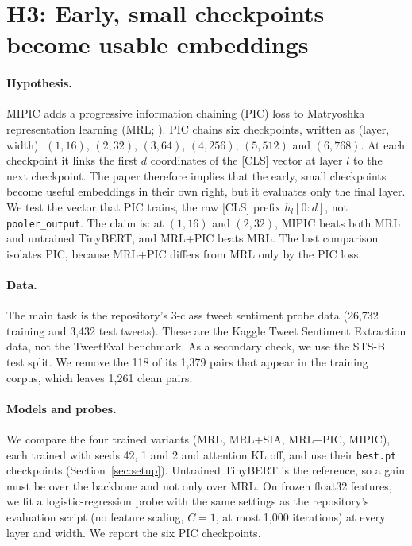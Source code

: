 \section{H3: Early, small checkpoints become usable embeddings}
\label{sec:h3}

\paragraph{Hypothesis.}
MIPIC \citep{mipic2026} adds a progressive information chaining (PIC) loss to Matryoshka representation learning (MRL; \citealp{kusupati2022mrl}).
PIC chains six checkpoints, written as (layer, width): $(1,16)$, $(2,32)$, $(3,64)$, $(4,256)$, $(5,512)$ and $(6,768)$.
At each checkpoint it links the first $d$ coordinates of the [CLS] vector at layer $l$ to the next checkpoint.
The paper therefore implies that the early, small checkpoints become useful embeddings in their own right, but it evaluates only the final layer.
We test the vector that PIC trains, the raw [CLS] prefix $h_l[0{:}d]$, not \texttt{pooler\_output}.
The claim is: at $(1,16)$ and $(2,32)$, MIPIC beats both MRL and untrained TinyBERT, and MRL+PIC beats MRL.
The last comparison isolates PIC, because MRL+PIC differs from MRL only by the PIC loss.

\paragraph{Data.}
The main task is the repository's 3-class tweet sentiment probe data (26,732 training and 3,432 test tweets).
These are the Kaggle Tweet Sentiment Extraction data, not the TweetEval benchmark.
As a secondary check, we use the STS-B test split.
We remove the 118 of its 1,379 pairs that appear in the training corpus, which leaves 1,261 clean pairs.

\paragraph{Models and probes.}
We compare the four trained variants (MRL, MRL+SIA, MRL+PIC, MIPIC), each trained with seeds 42, 1 and 2 and attention KL off, and use their \texttt{best.pt} checkpoints (Section~\ref{sec:setup}).
Untrained TinyBERT \citep{jiao-etal-2020-tinybert} is the reference, so a gain must be over the backbone and not only over MRL.
On frozen float32 features, we fit a logistic-regression probe with the same settings as the repository's evaluation script (no feature scaling, $C{=}1$, at most 1,000 iterations) at every layer and width.
We report the six PIC checkpoints.

